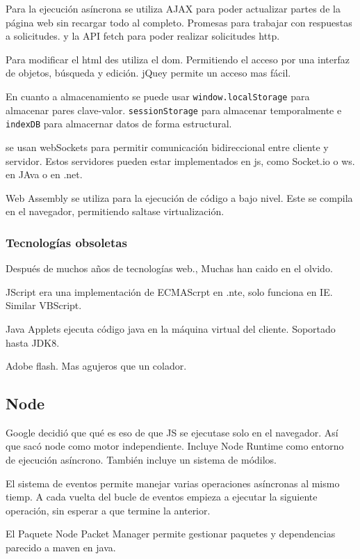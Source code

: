         Para la ejecución asíncrona se utiliza AJAX para poder actualizar partes de la página web sin recargar todo al completo. Promesas para trabajar con respuestas a solicitudes. y la API fetch para poder realizar solicitudes http.

        Para modificar el html des utiliza el dom. Permitiendo el acceso por una interfaz de objetos, búsqueda y edición. jQuey permite un acceso mas fácil.

        En cuanto a almacenamiento se puede usar \texttt{window.localStorage} para almacenar pares clave-valor. \texttt{sessionStorage} para almacenar temporalmente e \texttt{indexDB} para almacernar datos de forma estructural.

        se usan webSockets para permitir comunicación bidireccional entre cliente y servidor. Estos servidores pueden estar implementados en js, como Socket.io o ws. en JAva o en .net.

        Web Assembly se utiliza para la ejecución de código a bajo nivel. Este se compila en el navegador, permitiendo saltase virtualización.

    \subsubsection{Tecnologías obsoletas}
        Después de muchos años de tecnologías web., Muchas han caido en el olvido.

        JScript era una implementación de ECMAScrpt en .nte, solo funciona en IE. Similar VBScript.

        Java Applets ejecuta código java en la máquina virtual del cliente. Soportado hasta JDK8.

        Adobe flash. Mas agujeros que un colador.

\subsection{Node}
    Google decidió que qué es eso de que JS se ejecutase solo en el navegador. Así que sacó node como motor independiente. Incluye Node Runtime como entorno de ejecución asíncrono. También incluye un sistema de módilos.

    El sistema de eventos permite manejar varias operaciones asíncronas al mismo tiemp. A cada vuelta del bucle de eventos empieza a ejecutar la siguiente operación, sin esperar a que termine la anterior.

    El Paquete Node Packet Manager permite gestionar paquetes y dependencias parecido a maven en java.

